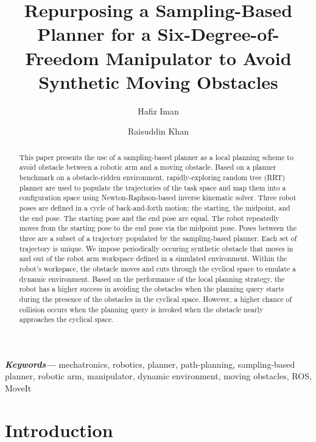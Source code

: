 \documentclass[a4paper, 10pt]{article}
\title{Repurposing a Sampling-Based Planner for a Six-Degree-of-Freedom Manipulator to Avoid Synthetic Moving Obstacles}
\author[1]{Hafiz Iman}
\author[1]{Raisuddin Khan}
\affil[1]{Department of Mechatronics Engineering, Kulliyah of Engineering, International Islamic University Malaysia}
\date{} %
\numberwithin{equation}{section} %
\providecommand{\keywords}[1]{\textbf{\textit{Keywords---}} #1}
\begin{document}
{\let\newpage\relax\maketitle}
\begin{abstract}
  This paper presents the use of a sampling-based planner 
  as a local planning scheme
  to avoid obstacle between a robotic arm and a moving obstacle.
  Based on a planner benchmark on a obstacle-ridden environment,
  rapidly-exploring random tree (RRT) planner are used to 
  populate the trajectories of the
  task space and map them into a configuration space using
  Newton-Raphson-based inverse kinematic solver.
  Three robot poses are defined in a cycle of back-and-forth motion; 
  the starting, the midpoint, 
  and the end pose. The starting pose and the end pose are equal.
  The robot repeatedly moves from the starting pose to the end pose via the 
  midpoint pose. Poses between the three are a subset of a trajectory populated 
  by the sampling-based planner. Each set of trajectory is unique. 
  We impose
  periodically occuring synthetic obstacle that moves in and out of 
  the robot arm workspace defined in a simulated environment. 
  Within the robot's workspace, 
  the obstacle moves and cuts through the cyclical space to emulate a 
  dynamic environment. Based on the performance of the local
  planning strategy, the robot has a higher success in
  avoiding the obstacles when the planning query starts during the presence of 
  the obstacles in the cyclical space. However, a higher chance of collision
  occurs when the planning query is invoked when the obstacle nearly 
  approaches the cyclical space.
\end{abstract}

\keywords{mechatronics, robotics, planner, path-planning, sampling-based planner, robotic arm, manipulator, dynamic environment, moving obstacles, ROS, MoveIt}

\section{Introduction}
\cite{Hagele2016}


\clearpage
\printbibliography
\end{document}
